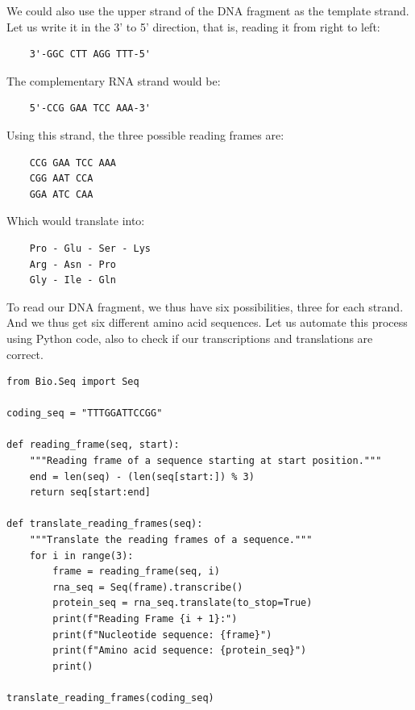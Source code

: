 We could also use the upper strand of the DNA fragment as the template strand. Let us write it in the 3' to 5' direction, that is, reading it from right to left:

\begin{verbatim}
    3'-GGC CTT AGG TTT-5'
\end{verbatim}

The complementary RNA strand would be:
\begin{verbatim}
    5'-CCG GAA TCC AAA-3'
\end{verbatim}

Using this strand, the three possible reading frames are:

\begin{verbatim}
    CCG GAA TCC AAA
    CGG AAT CCA
    GGA ATC CAA
\end{verbatim}

Which would translate into:

\begin{verbatim}
    Pro - Glu - Ser - Lys
    Arg - Asn - Pro
    Gly - Ile - Gln
\end{verbatim}

To read our DNA fragment,
we thus have six possibilities, three for each strand. And we thus get six different amino acid sequences. Let us automate this process using Python code, also to check if our transcriptions and translations are correct.

\vspace*{3mm}
\begin{lstlisting}
from Bio.Seq import Seq

coding_seq = "TTTGGATTCCGG"

def reading_frame(seq, start):
    """Reading frame of a sequence starting at start position."""
    end = len(seq) - (len(seq[start:]) % 3)
    return seq[start:end]

def translate_reading_frames(seq):
    """Translate the reading frames of a sequence."""
    for i in range(3):
        frame = reading_frame(seq, i)
        rna_seq = Seq(frame).transcribe()
        protein_seq = rna_seq.translate(to_stop=True)
        print(f"Reading Frame {i + 1}:")
        print(f"Nucleotide sequence: {frame}")
        print(f"Amino acid sequence: {protein_seq}")
        print()

translate_reading_frames(coding_seq)
\end{lstlisting}

